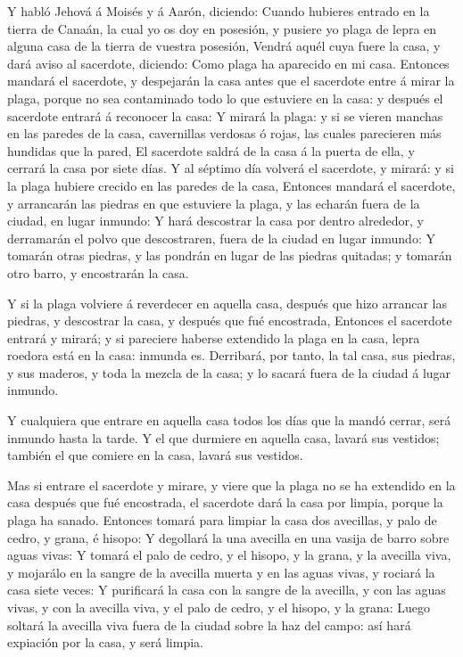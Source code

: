  Y habló Jehová á Moisés y á Aarón, diciendo:
 Cuando hubieres entrado en la tierra de Canaán, la cual
yo os doy en posesión, y pusiere yo plaga de lepra en alguna casa de la
tierra de vuestra posesión,  Vendrá aquél cuya fuere la
casa, y dará aviso al sacerdote, diciendo: Como plaga ha aparecido en mi
casa.  Entonces mandará el sacerdote, y despejarán la
casa antes que el sacerdote entre á mirar la plaga, porque no sea
contaminado todo lo que estuviere en la casa: y después el sacerdote
entrará á reconocer la casa:  Y mirará la plaga: y si se
vieren manchas en las paredes de la casa, cavernillas verdosas ó rojas,
las cuales parecieren más hundidas que la pared,  El
sacerdote saldrá de la casa á la puerta de ella, y cerrará la casa por
siete días.  Y al séptimo día volverá el sacerdote, y
mirará: y si la plaga hubiere crecido en las paredes de la casa,
 Entonces mandará el sacerdote, y arrancarán las piedras
en que estuviere la plaga, y las echarán fuera de la ciudad, en lugar
inmundo:  Y hará descostrar la casa por dentro alrededor,
y derramarán el polvo que descostraren, fuera de la ciudad en lugar
inmundo:  Y tomarán otras piedras, y las pondrán en lugar
de las piedras quitadas; y tomarán otro barro, y encostrarán la casa.

 Y si la plaga volviere á reverdecer en aquella casa,
después que hizo arrancar las piedras, y descostrar la casa, y después
que fué encostrada,  Entonces el sacerdote entrará y
mirará; y si pareciere haberse extendido la plaga en la casa, lepra
roedora está en la casa: inmunda es.  Derribará, por
tanto, la tal casa, sus piedras, y sus maderos, y toda la mezcla de la
casa; y lo sacará fuera de la ciudad á lugar inmundo.

 Y cualquiera que entrare en aquella casa todos los días
que la mandó cerrar, será inmundo hasta la tarde.  Y el
que durmiere en aquella casa, lavará sus vestidos; también el que
comiere en la casa, lavará sus vestidos.

 Mas si entrare el sacerdote y mirare, y viere que la
plaga no se ha extendido en la casa después que fué encostrada, el
sacerdote dará la casa por limpia, porque la plaga ha sanado.
 Entonces tomará para limpiar la casa dos avecillas, y
palo de cedro, y grana, é hisopo:  Y degollará la una
avecilla en una vasija de barro sobre aguas vivas:  Y
tomará el palo de cedro, y el hisopo, y la grana, y la avecilla viva, y
mojarálo en la sangre de la avecilla muerta y en las aguas vivas, y
rociará la casa siete veces:  Y purificará la casa con la
sangre de la avecilla, y con las aguas vivas, y con la avecilla viva, y
el palo de cedro, y el hisopo, y la grana:  Luego soltará
la avecilla viva fuera de la ciudad sobre la haz del campo: así hará
expiación por la casa, y será limpia.

